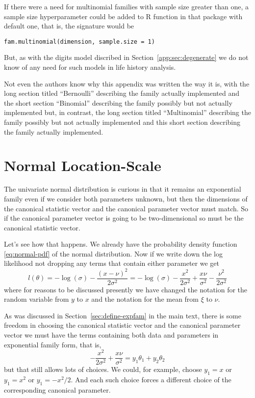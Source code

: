 If there were a need for multinomial families with sample size greater than
one, a sample size hyperparameter could be added to R function
 in that package with default one, that is,
the signature would be
\begin{verbatim}
fam.multinomial(dimension, sample.size = 1)
\end{verbatim}
But, as with the digits model discribed in Section~\ref{app:sec:degenerate}
we do not know of any need for such models in life history analysis.

Not even the authors know why this appendix was written the way it is,
with the long section titled ``Bernoulli'' describing the family
actually implemented and the short section ``Binomial'' describing the
family possibly but not actually implemented but, in contrast,
the long section titled ``Multinomial''
describing the family possibly but not actually implemented and
this short section describing the family actually implemented.

\section{Normal Location-Scale}

The univariate normal distribution is curious in that it remains an exponential
family even if we consider both parameters unknown, but then
the dimensions of the canonical statistic vector and the canonical parameter
vector must match.  So if the canonical parameter vector is going to be
two-dimensional so must be the canonical statistic vector.

Let's see how that happens.  We already have the probability density
function \eqref{eq:normal-pdf} of the normal distribution.
Now if we write down the log likelihood not dropping any terms that contain
either parameter we get
$$
   l(\theta)
   =
   - \log(\sigma) - \frac{(x - \nu)^2}{2 \sigma^2}
   =
   - \log(\sigma) - \frac{x^2}{2 \sigma^2}
   + \frac{x \nu}{\sigma^2}
   - \frac{\nu^2}{2 \sigma^2}
$$
where for reasons to be discussed presently we have changed the notation
for the random variable from $y$ to $x$ and the notation
for the mean from $\xi$ to $\nu$.

As was discussed in Section~\ref{sec:define-expfam} in the main text,
there is some freedom in choosing the canonical statistic vector and
the canonical parameter vector we must have the terms containing both
data and parameters in exponential family form, that is,
$$
   - \frac{x^2}{2 \sigma^2} + \frac{x \nu}{\sigma^2}
   =
   y_1 \theta_1 + y_2 \theta_2
$$
but that still allows lots of choices.
We could, for example, choose $y_1 = x$ or $y_1 = x^2$ or $y_1 = - x^2 / 2$.
And each such choice forces a different choice of the corresponding
canonical parameter.

